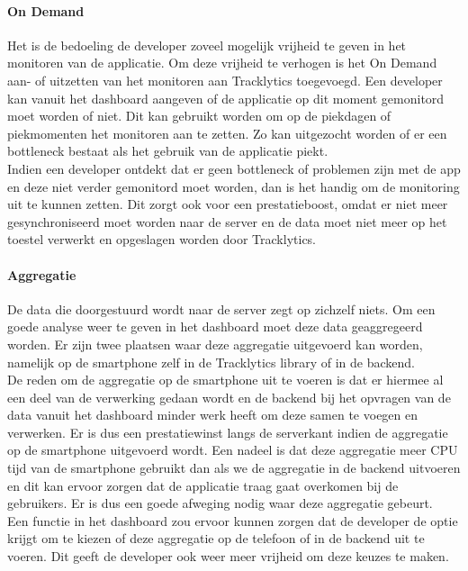\paragraph{On Demand}\label{par:OnDemand}
Het is de bedoeling de developer zoveel mogelijk vrijheid te geven in het monitoren van de applicatie. Om deze vrijheid te verhogen is het On Demand aan- of uitzetten van het monitoren aan Tracklytics toegevoegd. Een developer kan vanuit het dashboard aangeven of de applicatie op dit moment gemonitord moet worden of niet. Dit kan gebruikt worden om op de piekdagen of piekmomenten het monitoren aan te zetten. Zo kan uitgezocht worden of er een bottleneck bestaat als het gebruik van de applicatie piekt. \\
Indien een developer ontdekt dat er geen bottleneck of problemen zijn met de app en deze niet verder gemonitord moet worden, dan is het handig om de monitoring uit te kunnen zetten. Dit zorgt ook voor een prestatieboost, omdat er niet meer gesynchroniseerd moet worden naar de server en de data moet niet meer op het toestel verwerkt en opgeslagen worden door Tracklytics.


\paragraph{Aggregatie}
De data die doorgestuurd wordt naar de server zegt op zichzelf niets. Om een goede analyse weer te geven in het dashboard moet deze data geaggregeerd worden. Er zijn twee plaatsen waar deze aggregatie uitgevoerd kan worden, namelijk op de smartphone zelf in de Tracklytics library of in de backend. \\
De reden om de aggregatie op de smartphone uit te voeren is dat er hiermee al een deel van de verwerking gedaan wordt en de backend bij het opvragen van de data vanuit het dashboard minder werk heeft om deze samen te voegen en verwerken. Er is dus een prestatiewinst langs de serverkant indien de aggregatie op de smartphone uitgevoerd wordt. 
Een nadeel is dat deze aggregatie meer CPU tijd van de smartphone gebruikt dan als we de aggregatie in de backend uitvoeren en dit kan ervoor zorgen dat de applicatie traag gaat overkomen bij de gebruikers. Er is dus een goede afweging nodig waar deze aggregatie gebeurt.\\

Een functie in het dashboard zou ervoor kunnen zorgen dat de developer de optie krijgt om te kiezen of deze aggregatie op de telefoon of in de backend uit te voeren. Dit geeft de developer ook weer meer vrijheid om deze keuzes te maken.

